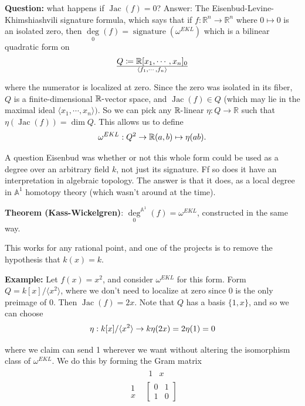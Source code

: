 \documentclass[11pt]{scrreprt}
\theoremstyle{definition}
\newcommand{\RR}[0]{{\mathbb{R}}}
\newcommand{\Af}[0]{{\mathbb{A}}}
\newcommand{\generators}[1]{\langle{#1}\rangle}
\newcommand{\theset}[1]{\{{#1}\}}
\newcommand{\dash}[0]{{\hbox{-}}}
\newcommand{\definedas}[0]{\coloneqq}
\begin{document}
\textbf{Question:} what happens if \(\operatorname{Jac}(f) = 0\)? Answer: The
Eisenbud-Levine-Khimshiashvili signature formula, which says that if
\(f: \RR^n \to \RR^n\) where \(0\mapsto 0\) is an isolated zero, then
\(\underset 0 \deg(f) = \operatorname{signature} (\omega^{EKL})\) which is a
bilinear quadratic form on \[
Q \definedas \RR[x_1, \cdots, x_n]_0 \over \generators{f_1, \cdots, f_n}
\]

where the numerator is localized at zero. Since the zero was isolated in
its fiber, \(Q\) is a finite-dimensional \(\RR\dash\)vector space, and
\(\operatorname{Jac}(f) \in Q\) (which may lie in the maximal ideal
\(\generators{x_1, \cdots, x_n})\). So we can pick any
\(\RR\dash\)linear \(\eta: Q \to \RR\) such that
\(\eta(\operatorname{Jac}(f)) = \dim Q\). This allows us to define \[
\omega^{EKL}: Q^2 \to \RR \\
(a,b) \mapsto \eta(ab).
\]

A question Eisenbud was whether or not this whole form could be used as
a degree over an arbitrary field \(k\), not just its signature. Ff so
does it have an interpretation in algebraic topology. The answer is that
it does, as a local degree in \(\Af^1\) homotopy theory (which wasn't
around at the time).

\textbf{Theorem (Kass-Wickelgren)}:
\(\underset 0 \deg^{\Af^1}(f) = \omega^{EKL}\), constructed in the same
way.

This works for any rational point, and one of the projects is to remove
the hypothesis that \(k(x) = k\).

\textbf{Example:} Let \(f(x) = x^2\), and consider \(\omega^{EKL}\) for
this form. Form \(Q = k[x]/\generators{x^2}\), where we don't need to
localize at zero since \(0\) is the only preimage of \(0\). Then
\(\operatorname{Jac}(f) = 2x\). Note that \(Q\) has a basis \(\theset{1, x}\),
and so we can choose \[
\eta: k[x]/\generators{x^2} \to k \\
\eta(2x) = 2\\
\eta(1) = 0
\]

where we claim can send 1 wherever we want without altering the
isomorphism class of \(\omega^{EKL}\). We do this by forming the Gram
matrix \[\begin{array}{cc}
 & \begin{matrix}1 & x\end{matrix} \\
 \begin{matrix}1 \\ x\end{matrix} & \begin{bmatrix} 0 & 1 \\ 1 & 0  \end{bmatrix}
\end{array}\]
\end{document}
